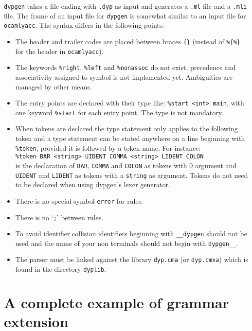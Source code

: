 \documentclass[12pt]{article}
\begin{document}
{\texttt{dypgen} takes a file ending with \texttt{.dyp} as input and generates a \texttt{.ml} file and a \texttt{.mli} file. The frame of an input file for \texttt{dypgen} is somewhat similar to an input file for \texttt{ocamlyacc}. The syntax differs in the following points:
\begin{itemize}
\item The header and trailer codes are placed between braces \texttt{\{\}} (instead of \texttt{\%\{\%\}} for the header in \texttt{ocamlyacc}).
\item The keywords \texttt{\%right}, \texttt{\%left} and \texttt{\%nonassoc} do not exist, precedence and associativity assigned to symbol is not implemented yet. Ambiguities are managed by other means.
\item The entry points are declared with their type like: \texttt{\%start <int> main}, with one keyword \texttt{\%start} for each entry point. The type is not mandatory.
\item When tokens are declared the type statement only applies to the following token and a type statement can be stated anywhere on a line beginning with \texttt{\%token}, provided it is followed by a token name. For instance:\\
\texttt{\%token BAR <string> UIDENT COMMA <string> LIDENT COLON}\\
is the declaration of \texttt{BAR}, \texttt{COMMA} and \texttt{COLON} as tokens with 0 argument and \texttt{UIDENT} and \texttt{LIDENT} as tokens with a \texttt{string} as argument. Tokens do not need to be declared when using dypgen's lexer generator.
\item There is no special symbol \texttt{error} for rules.
\item There is no `\texttt{;}' between rules.
\item To avoid identifier collision identifiers beginning with \verb|__dypgen| should not be used and the name of your non terminals should not begin with \verb|dypgen__|.
\item The parser must be linked against the library \texttt{dyp.cma} (or \texttt{dyp.cmxa}) which is found in the directory \texttt{dyplib}.
\end{itemize}

\section{A complete example of grammar extension}\label{complete example}

}
\end{document}
